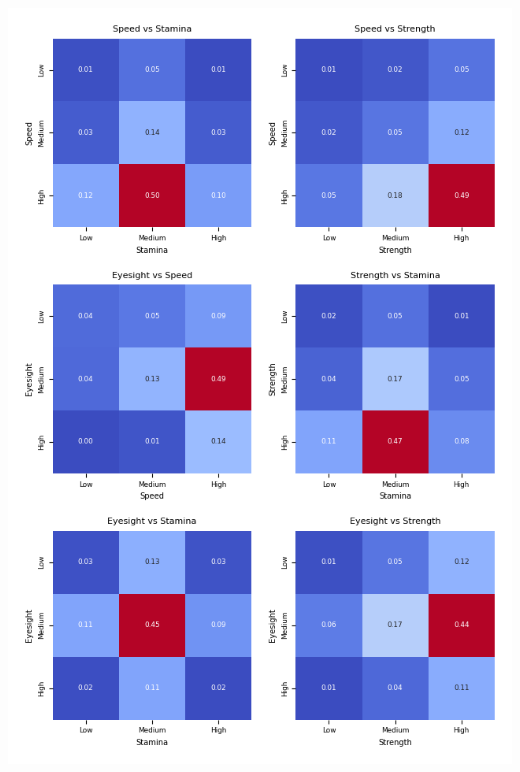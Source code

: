 \documentclass{article}
\begin{document}
\begin{center}
    \includegraphics[scale=0.9]{tests/2.10_confusion_matrices.png}
\end{center}
\end{document}
